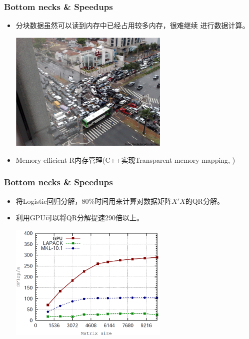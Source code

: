 \documentclass[10pt]{beamer}
\begin{document}
  \begin{frame}
    \frametitle{Bottom necks \& Speedups}

    \begin{itemize}


    \item 分块数据虽然可以读到内存中已经占用较多内存，很难继续
      进行数据计算。

      \begin{center}
        \includegraphics[width=0.6\textwidth]{memory-jam}
      \end{center}

    \item Memory-efficient R内存管理(C++实现Transparent memory
      mapping, \citet{kane2010scalable})

 \end{itemize}

  \end{frame}



  \begin{frame}
    \frametitle{Bottom necks \& Speedups}

    \begin{itemize}

    \item 将Logistic回归分解，80\%时间用来计算对数据矩阵$X'X$的QR分解。

    \item 利用GPU可以将QR分解提速290倍以上\citep{tomov2010dense}。

      \centering
      \includegraphics[width=0.6\textwidth]{QR}

 \end{itemize}

  \end{frame}
\end{document}
